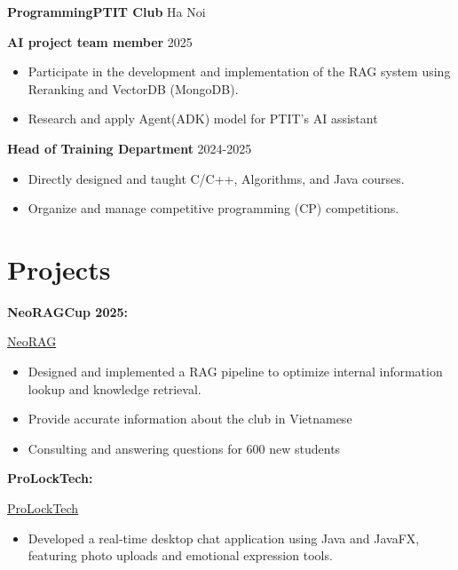 \documentclass[11pt]{article}
\newcommand{\cvsection}[1]{%
    \vspace{5pt}
    \section*{#1}%
    \hrulefill
    \vspace{5pt}
}
\begin{document}
\textbf{ProgrammingPTIT Club} \hfill Ha Noi

\textbf{AI project team member} \hfill 2025
\begin{itemize}[noitemsep, topsep=0pt, partopsep=0pt, parsep=0pt]
\item Participate in the development and implementation of the RAG system using Reranking and VectorDB (MongoDB).
\item Research and apply Agent(ADK) model for PTIT's AI assistant

\end{itemize}

\vspace{5pt}

\textbf{Head of Training Department} \hfill 2024-2025
\begin{itemize}[noitemsep, topsep=0pt, partopsep=0pt, parsep=0pt]
\item Directly designed and taught C/C++, Algorithms, and Java courses.
\item Organize and manage competitive programming (CP) competitions.
\end{itemize}

\cvsection{Projects}

\noindent \textbf{NeoRAGCup 2025:}

\href{https://github.com/HieuGM/NeoRAG_Cup_2025}{NeoRAG}
\begin{itemize}[noitemsep, topsep=0pt, partopsep=0pt, parsep=0pt, leftmargin=*]

\item Designed and implemented a RAG pipeline to optimize internal information lookup and knowledge retrieval.
\item Provide accurate information about the club in Vietnamese
\item Consulting and answering questions for 600 new students

\end{itemize}

\vspace{3pt}

\noindent \textbf{ProLockTech:}

\href{https://github.com/HieuGM/ProLockTech}{ProLockTech}
\begin{itemize}[noitemsep, topsep=0pt, partopsep=0pt, parsep=0pt, leftmargin=*]

\item Developed a real-time desktop chat application using Java and JavaFX, featuring photo uploads and emotional expression tools.
\end{itemize}
\end{document}
